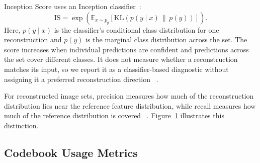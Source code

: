 Inception Score uses an Inception classifier~\cite{salimans2016improved}:
\begin{equation}
    \mathrm{IS}
    =
    \exp\!\left(
        \mathbb{E}_{x\sim p_g}
        \left[
            \mathrm{KL}\!\left(p(y\mid x)\,\|\,p(y)\right)
        \right]
    \right).
\end{equation}
Here, $p(y\mid x)$ is the classifier's conditional class distribution for one
reconstruction and $p(y)$ is the marginal class distribution across the set.
The score increases when individual predictions are confident and predictions
across the set cover different classes. It does not measure whether a
reconstruction matches its input, so we report it as a classifier-based
diagnostic without assigning it a preferred reconstruction direction
~\cite{barratt2018note,chong2019unbiased}.

For reconstructed image sets, precision measures how much of the reconstruction
distribution lies near the reference feature distribution, while recall
measures how much of the reference distribution is covered
~\cite{kynkaanniemi2019improved}. Figure~\ref{fig:precision_recall_tradeoff}
illustrates this distinction.

\begin{figure}[t]
    \centering
    
    \label{fig:precision_recall_tradeoff}
\end{figure}

\subsection{Codebook Usage Metrics}
\label{subsec:codebook_usage_metrics}

